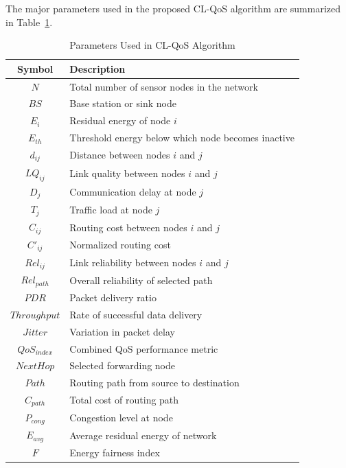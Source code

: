 \documentclass[a4paper,fleqn]{cas-dc}
\numberwithin{equation}{section}
\begin{document}
The major parameters used in the proposed CL-QoS algorithm are summarized in Table~\ref{tab:params}.

\begin{table}[H]
\centering
\caption{Parameters Used in CL-QoS Algorithm}
\label{tab:params}
\renewcommand{\arraystretch}{1.2}
\begin{tabular}{|c|p{6cm}|}
\hline
\textbf{Symbol} & \textbf{Description} \\
\hline

$N$ & Total number of sensor nodes in the network \\
$BS$ & Base station or sink node \\
$E_i$ & Residual energy of node $i$ \\
$E_{th}$ & Threshold energy below which node becomes inactive \\
$d_{ij}$ & Distance between nodes $i$ and $j$ \\
$LQ_{ij}$ & Link quality between nodes $i$ and $j$ \\
$D_j$ & Communication delay at node $j$ \\
$T_j$ & Traffic load at node $j$ \\
$C_{ij}$ & Routing cost between nodes $i$ and $j$ \\
$C'_{ij}$ & Normalized routing cost \\
$Rel_{ij}$ & Link reliability between nodes $i$ and $j$ \\
$Rel_{path}$ & Overall reliability of selected path \\
$PDR$ & Packet delivery ratio \\
$Throughput$ & Rate of successful data delivery \\
$Jitter$ & Variation in packet delay \\
$QoS_{index}$ & Combined QoS performance metric \\
$NextHop$ & Selected forwarding node \\
$Path$ & Routing path from source to destination \\
$C_{path}$ & Total cost of routing path \\
$P_{cong}$ & Congestion level at node \\
$E_{avg}$ & Average residual energy of network \\
$F$ & Energy fairness index \\
\hline

\end{tabular}
\end{table}
\end{document}
